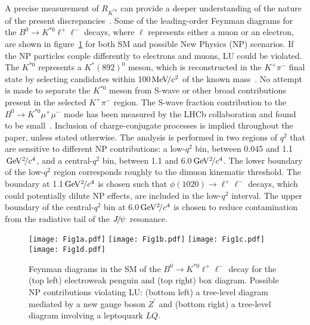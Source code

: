 \documentclass[12pt,a4paper]{article}
\def\RKst    {\mbox{R_{\Kstarz}}}
\def\lhcb {\mbox{LHCb}\xspace}
\def\Pmu         {\ensuremath{\upmu}\xspace}
\def\Ppi         {\ensuremath{\uppi}\xspace}
\def\Ppsi        {\ensuremath{\uppsi}\xspace}
\def\PB      {\ensuremath{\mathrm{B}}\xspace}
\def\PJ      {\ensuremath{\mathrm{J}}\xspace}
\def\PK      {\ensuremath{\mathrm{K}}\xspace}
\def\PZ      {\ensuremath{\mathrm{Z}}\xspace}
\def\Pmu         {\ensuremath{\mu}\xspace}
\def\Ppi         {\ensuremath{\pi}\xspace}
\def\Ppsi        {\ensuremath{\psi}\xspace}
\def\PB      {\ensuremath{B}\xspace}
\def\PJ      {\ensuremath{J}\xspace}
\def\PK      {\ensuremath{K}\xspace}
\def\PZ      {\ensuremath{Z}\xspace}
\def\mup        {\ensuremath{\Pmu^+}\xspace}
\def\mun        {\ensuremath{\Pmu^-}\xspace} \def\mumu       {\ensuremath{\Pmu^+\Pmu^-}\xspace}
\def\lepton     {\ensuremath{\ell}\xspace}
\def\ellm       {\ensuremath{\ell^-}\xspace}
\def\ellp       {\ensuremath{\ell^+}\xspace}
\def\Z      {\ensuremath{\PZ}\xspace}
\def\pion  {\ensuremath{\Ppi}\xspace}
\def\pim   {\ensuremath{\pion^-}\xspace}
\def\kaon  {\ensuremath{\PK}\xspace}
\def\Kp    {\ensuremath{\kaon^+}\xspace}
\def\Kstarz  {\ensuremath{\kaon^{*0}}\xspace}
\def\Kstar   {\ensuremath{\kaon^*}\xspace}
\def\B       {\ensuremath{\PB}\xspace}
\def\Bd      {\ensuremath{\B^0}\xspace}
\def\jpsi     {\ensuremath{{\PJ\mskip -3mu/\mskip -2mu\Ppsi\mskip 2mu}}\xspace}
\newcommand{\decay}[2]{\ensuremath{#1\!\to #2}\xspace}         \def\ra                 {\ensuremath{\rightarrow}\xspace}
\def\to                 {\ensuremath{\rightarrow}\xspace}
\def\qsq       {\ensuremath{q^2}\xspace}
\def\BdToKstmm    {\decay{\Bd}{\Kstarz\mup\mun}}
\newcommand{\gevgevcccc}{\ensuremath{{\mathrm{\,Ge\kern -0.1em V^2\!/}c^4}}\xspace}
\newcommand{\mevcc}{\ensuremath{{\mathrm{\,Me\kern -0.1em V\!/}c^2}}\xspace}
\def\lqsq{low-\qsq}
\def\cqsq{central-\qsq}
\def\RKst{\ensuremath{R_{\Kstarz}}\xspace}
\def\KPi{\ensuremath{\Kp\pim}\xspace}
\def\ll{\ensuremath{\ellp\ellm}\xspace}
\def\BdToKstll{\mbox{\decay{\Bd}{\Kstarz \ll}}\xspace}
\def\BdToKstmm{\mbox{\decay{\Bd}{\Kstarz \mumu}}\xspace}
\begin{document}
A precise measurement of \RKst can provide a deeper understanding of the nature of the present discrepancies~\cite{Hiller:2014ula}.
Some of the leading-order Feynman diagrams for the \BdToKstll decays, where \lepton represents either a muon or an electron, are shown in figure~\ref{fig:Feynman} for both SM and possible New Physics (NP) scenarios.
If the NP particles couple differently to electrons and muons, LU could be violated.
The \Kstarz represents a $\Kstar(892)^{0}$ meson, which is reconstructed in the \KPi final state by selecting candidates within 100\mevcc of the known mass~\cite{Olive:2016xmw}.
No attempt is made to separate the \Kstarz meson from S-wave or other broad contributions present in the selected \KPi region.
The S-wave fraction contribution to the \BdToKstmm mode has been measured by the \lhcb collaboration and found to be small~\cite{LHCb-PAPER-2016-012}.
Inclusion of charge-conjugate processes is implied throughout the paper, unless stated otherwise.
The analysis is performed in two regions of \qsq that are sensitive to different NP contributions: a \lqsq bin, between 0.045 and 1.1\gevgevcccc, and a \cqsq bin, between 1.1 and 6.0\gevgevcccc.  
The lower boundary of the \lqsq region corresponds roughly to the dimuon kinematic threshold.
The boundary at 1.1\gevgevcccc is chosen such that \decay{\phi(1020)}{\ll} decays, which could potentially dilute NP effects, are included in the \lqsq interval.
The upper boundary of the \cqsq bin at 6.0\gevgevcccc is chosen to reduce contamination  from the radiative tail of the \jpsi resonance. 

\begin{figure}[t!]
\centering
\texttt{[image: Fig1a.pdf]} 
\texttt{[image: Fig1b.pdf]}
\texttt{[image: Fig1c.pdf]}
\texttt{[image: Fig1d.pdf]}
\vspace{0.1cm}
\caption{Feynman diagrams in the SM of the \BdToKstll decay for the (top left) electroweak penguin and (top right) box diagram. Possible NP contributions violating LU: (bottom left) a tree-level diagram mediated by a new gauge boson $\Z^{\prime}$ and (bottom right) a tree-level diagram involving a leptoquark $LQ$.}
\label{fig:Feynman}
\end{figure}
\end{document}
